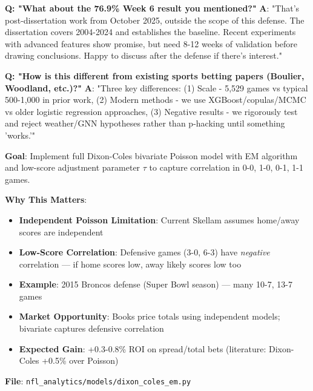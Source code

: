 \textbf{Q: "What about the 76.9\% Week 6 result you mentioned?"}
\textbf{A}: "That's post-dissertation work from October 2025, outside the scope of this defense. The dissertation covers 2004-2024 and establishes the baseline. Recent experiments with advanced features show promise, but need 8-12 weeks of validation before drawing conclusions. Happy to discuss after the defense if there's interest."

\textbf{Q: "How is this different from existing sports betting papers (Boulier, Woodland, etc.)?"}
\textbf{A}: "Three key differences: (1) Scale - 5,529 games vs typical 500-1,000 in prior work, (2) Modern methods - we use XGBoost/copulas/MCMC vs older logistic regression approaches, (3) Negative results - we rigorously test and reject weather/GNN hypotheses rather than p-hacking until something 'works.'"


\textbf{Goal}: Implement full Dixon-Coles bivariate Poisson model with EM algorithm and low-score adjustment parameter $\tau$ to capture correlation in 0-0, 1-0, 0-1, 1-1 games.

\textbf{Why This Matters}:
\begin{itemize}
  \item \textbf{Independent Poisson Limitation}: Current Skellam assumes home/away scores are independent
  \item \textbf{Low-Score Correlation}: Defensive games (3-0, 6-3) have \textit{negative} correlation — if home scores low, away likely scores low too
  \item \textbf{Example}: 2015 Broncos defense (Super Bowl season) — many 10-7, 13-7 games
  \item \textbf{Market Opportunity}: Books price totals using independent models; bivariate captures defensive correlation
  \item \textbf{Expected Gain}: +0.3-0.8\% ROI on spread/total bets (literature: Dixon-Coles +0.5\% over Poisson)
\end{itemize}

\textbf{File}: \texttt{nfl\_analytics/models/dixon\_coles\_em.py}

